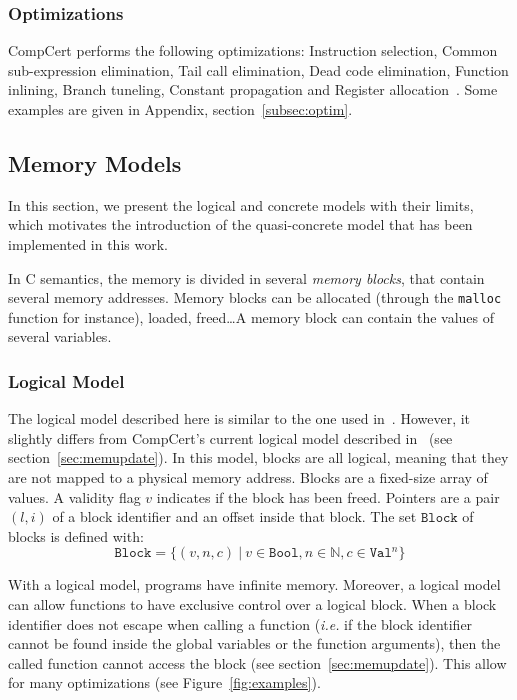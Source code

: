 \subsubsection{Optimizations}
CompCert performs the following optimizations:
Instruction selection, Common sub-expression elimination, Tail call elimination, Dead code elimination, Function inlining, Branch tuneling, Constant propagation and Register allocation~\cite{compcertoverview}. Some examples are given in Appendix, section~\ref{subsec:optim}.
 

\subsection{Memory Models}
\label{subsec:models}
In this section, we present the logical and concrete models with their limits, which motivates the introduction of the quasi-concrete model that has been implemented in this work.

In C semantics, the memory is divided in several \textit{memory blocks}, that contain several memory addresses. Memory blocks can be allocated (through the \texttt{malloc} function for instance), loaded, freed\dots A memory block can contain the values of several variables. 
\subsubsection{Logical Model}
The logical model described here is similar to the one used in~\cite{DBLP:conf/pldi/KangHMGZV15}. However, it slightly differs from CompCert's current logical model described in~\cite{leroy:hal-00703441} (see section~\ref{sec:memupdate}).
In this model, blocks are all logical, meaning that they are not mapped to a physical memory address.
Blocks are a fixed-size array of values.
A validity flag $v$ indicates if the block has been freed.
Pointers are a pair $(l,i)$ of a block identifier and an offset inside that block.
The set $\texttt{Block}$ of blocks is defined with:
$$\texttt{Block}=\{(v,n,c)~|~v\in\texttt{Bool},n\in\mathbb{N},c\in\texttt{Val}^{n}\}$$

With a logical model, programs have infinite memory.
Moreover, a logical model can allow functions to have exclusive control over a logical block.
When a block identifier does not escape when calling a function (\textit{i.e.} if the block identifier cannot be found inside the global variables or the function arguments), then the called function cannot access the block (see section~\ref{sec:memupdate}).%
This allow for many optimizations (see Figure~\ref{fig:examples}).

